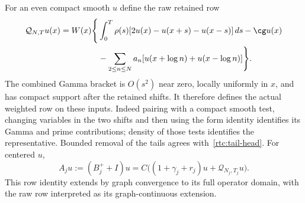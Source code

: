 \documentclass[11pt,a4paper]{article}
\numberwithin{equation}{section}
\theoremstyle{definition}\newtheorem{definition}[theorem]{Definition}
\theoremstyle{remark}\newtheorem{remark}[theorem]{Remark}
\begin{document}
For an even compact smooth $u$ define the raw retained row
\begin{align}
 \mathcal Q_{N,T}u(x)=W(x)\Bigg\{&
 \int_0^T\rho(s)[2u(x)-u(x+s)-u(x-s)]\,ds
 -\cg u(x)\notag\\
 &-\sum_{2\le n\le N}a_n
      [u(x+\log n)+u(x-\log n)]\Bigg\}.
 \label{rtc:tail-raw-row}
\end{align}
The combined Gamma bracket is $O(s^2)$ near zero, locally uniformly in
$x$, and has compact support after the retained shifts.  It therefore
defines the actual weighted row on these inputs.  Indeed pairing with a
compact smooth test, changing variables in the two shifts and then
using the form identity identifies its Gamma and prime contributions;
density of those tests identifies the representative.  Bounded removal
of the tails agrees with~\eqref{rtc:tail-head}.  For centered $u$,
\begin{equation}\label{rtc:tail-centered-row}
 A_ju:=(B_j^++I)u
 =C\bigl((1+\gamma_j+r_j)u+\mathcal Q_{N_j,T_j}u\bigr).
\end{equation}
This row identity extends by graph convergence to its full operator
domain, with the raw row interpreted as its graph-continuous extension.
\end{document}
